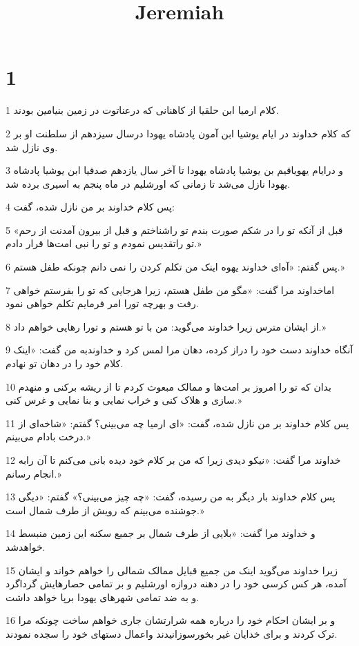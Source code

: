 

\title{Jeremiah}

 
\chapter{1}

\par 1 کلام ارمیا ابن حلقیا از کاهنانی که درعناتوت در زمین بنیامین بودند.
\par 2 که کلام خداوند در ایام یوشیا ابن آمون پادشاه یهودا درسال سیزدهم از سلطنت او بر وی نازل شد.
\par 3 و درایام یهویاقیم بن یوشیا پادشاه یهودا تا آخر سال یازدهم صدقیا ابن یوشیا پادشاه یهودا نازل می‌شد تا زمانی که اورشلیم در ماه پنجم به اسیری برده شد.
\par 4 پس کلام خداوند بر من نازل شده، گفت:
\par 5 «قبل از آنکه تو را در شکم صورت بندم تو راشناختم و قبل از بیرون آمدنت از رحم تو راتقدیس نمودم و تو را نبی امت‌ها قرار دادم.»
\par 6 پس گفتم: «آه‌ای خداوند یهوه اینک من تکلم کردن را نمی دانم چونکه طفل هستم.»
\par 7 اماخداوند مرا گفت: «مگو من طفل هستم، زیرا هرجایی که تو را بفرستم خواهی رفت و بهر‌چه تورا امر فرمایم تکلم خواهی نمود.
\par 8 از ایشان مترس زیرا خداوند می‌گوید: من با تو هستم و تورا رهایی خواهم داد.»
\par 9 آنگاه خداوند دست خود را دراز کرده، دهان مرا لمس کرد و خداوندبه من گفت: «اینک کلام خود را در دهان تو نهادم.
\par 10 بدان که تو را امروز بر امت‌ها و ممالک مبعوث کردم تا از ریشه برکنی و منهدم سازی و هلاک کنی و خراب نمایی و بنا نمایی و غرس کنی.»
\par 11 پس کلام خداوند بر من نازل شده، گفت: «ای ارمیا چه می‌بینی؟ گفتم: «شاخه‌ای از درخت بادام می‌بینم.»
\par 12 خداوند مرا گفت: «نیکو دیدی زیرا که من بر کلام خود دیده بانی می‌کنم تا آن رابه انجام رسانم.»
\par 13 پس کلام خداوند بار دیگر به من رسیده، گفت: «چه چیز می‌بینی؟» گفتم: «دیگی جوشنده می‌بینم که رویش از طرف شمال است.»
\par 14 و خداوند مرا گفت: «بلایی از طرف شمال بر جمیع سکنه این زمین منبسط خواهدشد.
\par 15 زیرا خداوند می‌گوید اینک من جمیع قبایل ممالک شمالی را خواهم خواند و ایشان آمده، هر کس کرسی خود را در دهنه دروازه اورشلیم و بر تمامی حصارهایش گرداگرد و به ضد تمامی شهرهای یهودا برپا خواهد داشت.
\par 16 و بر ایشان احکام خود را درباره همه شرارتشان جاری خواهم ساخت چونکه مرا ترک کردند و برای خدایان غیر بخور‌سوزانیدند واعمال دستهای خود را سجده نمودند.
